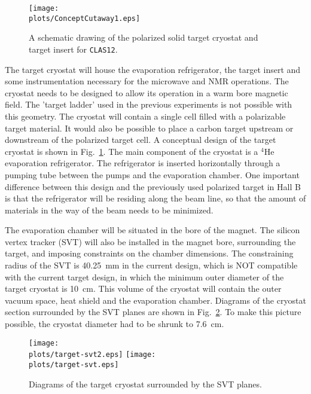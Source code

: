 \begin{figure}[ht]
\texttt{[image: \\plots/ConceptCutaway1.eps]}
\caption{A schematic drawing of the polarized solid target cryostat and 
target insert for {\tt CLAS12}.} 
\label{cryostat}
\end{figure}

The target cryostat will house the evaporation refrigerator, the target 
insert and some instrumentation necessary for the microwave and NMR 
operations. The cryostat needs to be designed to allow its operation in a 
warm bore magnetic field. The 'target ladder' used in the previous experiments 
is not possible with this geometry. The cryostat will contain a single cell 
filled with a polarizable target material. It would also be possible to 
place a carbon target upstream or downstream of the polarized target cell.
A conceptual design of the target cryostat is shown in Fig.~\ref{cryostat}.
The main component of the cryostat is a $^{4}$He evaporation refrigerator. 
The refrigerator is inserted horizontally through a pumping tube between the 
pumps and the evaporation chamber. One important difference between this 
design and the previously used polarized target in Hall B is that the 
refrigerator will be residing along the beam line, so that the amount of 
materials in the way of the beam needs to be  minimized. 
 
The evaporation chamber will be situated in the bore of the magnet.  The 
silicon vertex tracker (SVT) will also be installed in the magnet bore, 
surrounding the target, and imposing constraints on the chamber dimensions. 
The constraining radius of the SVT is 40.25~mm in the current design, which 
is NOT compatible with the current target design, in which the minimum outer 
diameter of the target cryostat is 10~cm.  This volume of the cryostat will 
contain the outer vacuum space, heat shield and the evaporation chamber. 
Diagrams of the cryostat section surrounded by the SVT planes are shown in 
Fig.~\ref{target-svt}. To make this picture possible, the cryostat diameter 
had to be shrunk to 7.6~cm.

\begin{figure}[h]
\begin{center}
\texttt{[image: \\plots/target-svt2.eps]}
\texttt{[image: \\plots/target-svt.eps]}
\caption{Diagrams of the target cryostat surrounded by 
the SVT planes.}
\end{center}
\label{target-svt} 
\end{figure}

